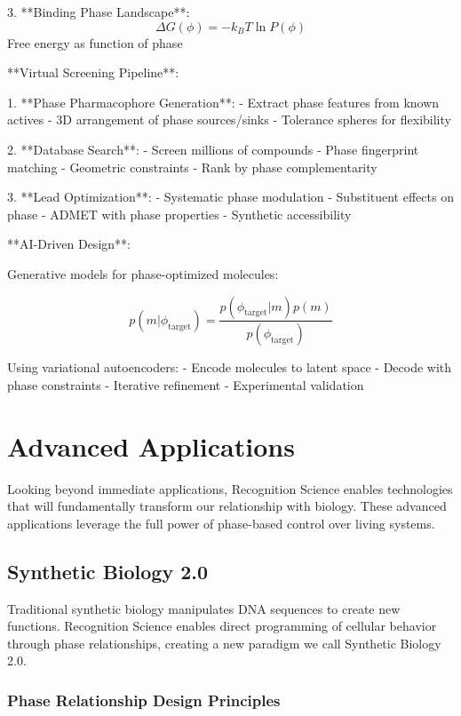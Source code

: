 \documentclass[12pt,a4paper]{report}
\begin{document}
3. **Binding Phase Landscape**:
   \begin{equation}
   \Delta G(\phi) = -k_B T \ln P(\phi)
   \end{equation}
   Free energy as function of phase

**Virtual Screening Pipeline**:

1. **Phase Pharmacophore Generation**:
   - Extract phase features from known actives
   - 3D arrangement of phase sources/sinks
   - Tolerance spheres for flexibility

2. **Database Search**:
   - Screen millions of compounds
   - Phase fingerprint matching
   - Geometric constraints
   - Rank by phase complementarity

3. **Lead Optimization**:
   - Systematic phase modulation
   - Substituent effects on phase
   - ADMET with phase properties
   - Synthetic accessibility

**AI-Driven Design**:

Generative models for phase-optimized molecules:

\begin{equation}
p(m|\phi_{\text{target}}) = \frac{p(\phi_{\text{target}}|m) p(m)}{p(\phi_{\text{target}})}
\end{equation}

Using variational autoencoders:
- Encode molecules to latent space
- Decode with phase constraints
- Iterative refinement
- Experimental validation

\chapter{Advanced Applications}

Looking beyond immediate applications, Recognition Science enables technologies that will fundamentally transform our relationship with biology. These advanced applications leverage the full power of phase-based control over living systems.

\section{Synthetic Biology 2.0}

Traditional synthetic biology manipulates DNA sequences to create new functions. Recognition Science enables direct programming of cellular behavior through phase relationships, creating a new paradigm we call Synthetic Biology 2.0.

\subsection{Phase Relationship Design Principles}
\end{document}
